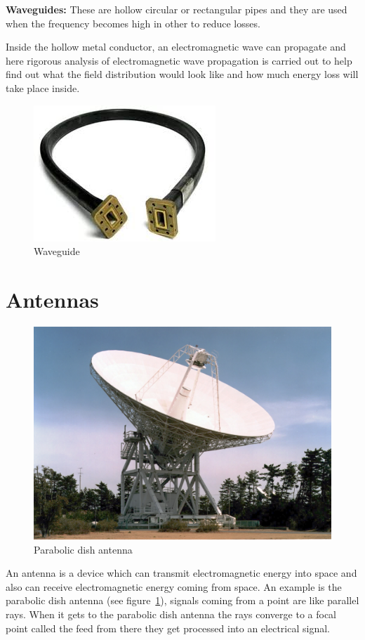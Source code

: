 \textbf{Waveguides:} These are hollow circular or rectangular pipes and they are used when the frequency becomes high in other to reduce losses. 

Inside the hollow metal conductor, an electromagnetic wave can propagate and here rigorous analysis of electromagnetic wave propagation is carried out to help find out what the field distribution would look like and how much energy loss will take place inside.
\begin{figure}[h]
\centering
\includegraphics[scale=0.5]{./graphics/waveguide2}
\caption{Waveguide}
\end{figure}

\section{Antennas}
\begin{figure}[h]
\centering
\includegraphics[scale=0.4]{./graphics/spcaceantenna}
\caption{Parabolic dish antenna}
\label{fig:spaceantenna}
\end{figure}

An antenna is a device which can transmit electromagnetic energy into space and also can receive electromagnetic energy coming from space. An example is the parabolic dish antenna (see figure~\ref{fig:spaceantenna}), signals coming from a point are like parallel rays. When it gets to the parabolic dish antenna the rays converge to a focal point called the feed from there they get processed into an electrical signal.

